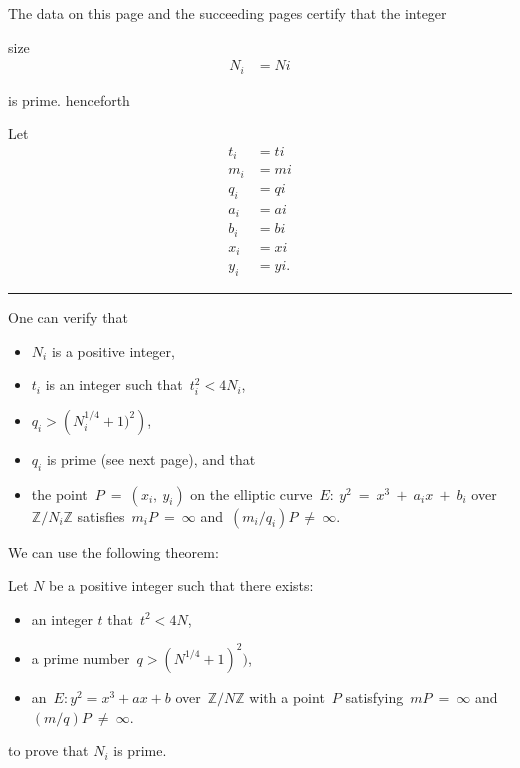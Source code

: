 \pagestyle{empty}
\phantom{a}
\vspace{2em}

\begin{center}
{\Huge {}}
\end{center}
\vspace{2em}

\noindent The data on this page and the succeeding pages certify that the integer

{ {{ size }}%
\begin{align*}
N_{ {{ i }} } &= {{ Ni }}
\end{align*}
}

\noindent is prime. {{ henceforth }}

\vspace{2em}

\noindent Let
{\tiny
\begin{align*}
t_{ {{ i }} } &= {{ ti }} \\
m_{ {{ i }} } &= {{ mi }} \\
q_{ {{ i }} } &= {{ qi }} \\
a_{ {{ i }} } &= {{ ai }} \\
b_{ {{ i }} } &= {{ bi }} \\
x_{ {{ i }} } &= {{ xi }} \\
y_{ {{ i }} } &= {{ yi }}.
\end{align*}
}

\vspace{0.5em}
\hrule
\vspace{0.5em}

\begin{multicols}{2}
\noindent One can verify that
\begin{itemize}
\item $N_{ {{ i }} }$ is a positive integer,
\item $t_{ {{ i }} }$ is an integer such that~$t_{ {{ i }} }^2 < 4N_{ {{ i }} }$,
\item $q_{ {{ i }} } > \left(N_{ {{ i }} }^{1/4} + 1)^2\right)$,
\item $q_{ {{ i }} }$ is prime (see next page), and that
\item the point~$P~=~(x_{ {{ i }} },~y_{ {{ i }} })$ on the elliptic curve~$E:~y^2~=~x^3~+~a_{ {{ i }} }x~+~b_{ {{ i }} }$ over~$\mathbb{Z}/{N_{ {{ i }} }}\mathbb{Z}$ satisfies~$m_{ {{ i }} }P~=~\infty$ and~$(m_{ {{ i }} }/q_{ {{ i }} })P~\neq~\infty$.
\end{itemize}
\columnbreak
\noindent We can use the following theorem:
\begin{theorem*}
Let $N$ be a positive integer such that there exists:
\begin{itemize}
\item an integer $t$ that~$t^2 < 4N$,
\item a prime number~$q > (N^{1/4} + 1)^2)$,
\item an~$E: y^2 = x^3 + ax + b$ over~$\mathbb{Z}/{N}\mathbb{Z}$ with a point~$P$ satisfying~$mP~=~\infty$ and~$(m/q)P~\neq~\infty$.
\end{itemize}
\end{theorem*}
\noindent to prove that $N_{ {{ i }} }$ is prime.
\end{multicols}

\newpage